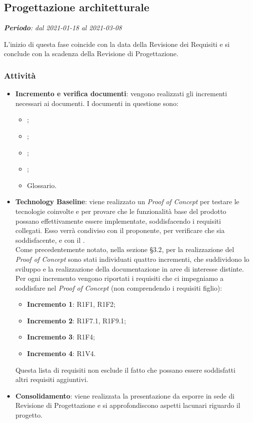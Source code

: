 \subsection{Progettazione architetturale}
\textit{\textbf{Periodo}: dal 2021-01-18 al 2021-03-08}

L'inizio di questa fase coincide con la data della Revisione dei Requisiti e si conclude con la scadenza della Revisione di Progettazione.

\subsubsection{Attività}

\begin{itemize}
\item \textbf{Incremento e verifica documenti}: vengono realizzati gli incrementi necessari ai documenti. I documenti in questione sono:
\begin{itemize}
\item \NdP{};
\item \AdR{};
\item \PdQ{};
\item \PdP{};
\item Glossario.
\end{itemize}
\item \textbf{Technology Baseline}: viene realizzato un \textit{Proof of Concept} per testare le tecnologie coinvolte e per provare che le funzionalità base del prodotto possano effettivamente essere implementate, soddisfacendo i requisiti collegati. Esso verrà condiviso con il proponente, per verificare che sia soddisfacente, e con il \CR{}.\\ Come precedentemente notato, nella sezione \S{3.2}, per la realizzazione del \textit{Proof of Concept} sono stati individuati quattro incrementi, che suddividono lo sviluppo e la realizzazione della documentazione in aree di interesse distinte. Per ogni incremento vengono riportati i requisiti che ci impegniamo a soddisfare nel \textit{Proof of Concept} (non comprendendo i requisiti figlio):
\begin{itemize}
\item \textbf{Incremento 1}: R1F1, R1F2;
\item \textbf{Incremento 2}: R1F7.1, R1F9.1;
\item \textbf{Incremento 3}: R1F4;
\item \textbf{Incremento 4}: R1V4.
\end{itemize}
Questa lista di requisiti non esclude il fatto che possano essere soddisfatti altri requisiti aggiuntivi.
\item \textbf{Consolidamento}: viene realizzata la presentazione da esporre in sede di Revisione di Progettazione e si approfondiscono aspetti lacunari riguardo il progetto.
\end{itemize}

